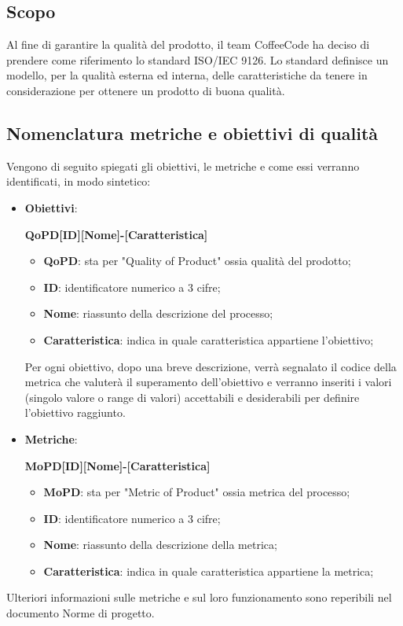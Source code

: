 \documentclass[../piano-di-qualifica.tex]{subfiles}
\begin{document}
\subsection{Scopo}%
\label{sec:scopo}
Al fine di garantire la qualità del prodotto, il team CoffeeCode ha deciso di prendere come riferimento lo standard ISO/IEC 9126.
Lo standard definisce un modello, per la qualità esterna ed interna, delle caratteristiche da tenere in considerazione per ottenere un prodotto di buona qualità.

\subsection{Nomenclatura metriche e obiettivi di qualità}%
\label{sub:nomenclatura_metriche_e_obiettivi_di_qualita}
Vengono di seguito spiegati gli obiettivi, le metriche e come essi verranno identificati, in modo sintetico:
\begin{itemize}
    \item \textbf{Obiettivi}: 
    \begin{center}
        \centering
        \textbf{QoPD[ID][Nome]-[Caratteristica]}%
    \end{center} 
        \begin{itemize}
            \item \textbf{QoPD}: sta per "Quality of Product" ossia qualità del prodotto;
            \item \textbf{ID}: identificatore numerico a 3 cifre;
            \item \textbf{Nome}: riassunto della descrizione del processo;
            \item \textbf{Caratteristica}: indica in quale caratteristica appartiene l'obiettivo;
        \end{itemize}
        Per ogni obiettivo, dopo una breve descrizione, verrà segnalato il codice della metrica che valuterà il superamento dell'obiettivo e verranno inseriti i valori (singolo valore o range di valori) accettabili e desiderabili per definire l'obiettivo raggiunto.
    \item \textbf{Metriche}: 
    \begin{center}
        \centering
        \textbf{MoPD[ID][Nome]-[Caratteristica]}%
    \end{center} 
        \begin{itemize}
            \item \textbf{MoPD}: sta per "Metric of Product" ossia metrica del processo;
            \item \textbf{ID}: identificatore numerico a 3 cifre;
            \item \textbf{Nome}: riassunto della descrizione della metrica;
            \item \textbf{Caratteristica}: indica in quale caratteristica appartiene la metrica;
        \end{itemize}
\end{itemize}  
Ulteriori informazioni sulle metriche e sul loro funzionamento sono reperibili nel documento Norme di progetto.
\end{document}
